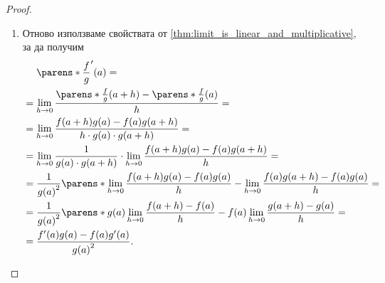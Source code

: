 \documentclass{../../common/topic}
\begin{document}
\begin{proof}
\begin{enumerate}
    \item Отново използваме свойствата от \cref{thm:limit_is_linear_and_multiplicative}, за да получим
    \begin{align*}
      &\phantom{{}={}} \parens*{ \frac f g }'(a)
      = \\ &=
      \lim_{h \to 0} \frac {\parens*{\frac f g }(a+h) - \parens*{\frac f g }(a)} h
      = \\ &=
      \lim_{h \to 0} \frac {f(a+h) g(a) - f(a) g(a+h)} {h \cdot g(a) \cdot g(a+h)}
      = \\ &=
      \lim_{h \to 0} \frac 1 {g(a) \cdot g(a+h)} \cdot \lim_{h \to 0} \frac {f(a+h) g(a) - f(a) g(a+h)} h
      = \\ &=
      \frac 1 {{g(a)}^2} \parens*{ \lim_{h \to 0} \frac {f(a+h) g(a) - f(a) g(a)} h - \lim_{h \to 0} \frac {f(a) g(a+h) - f(a) g(a)} h }
      = \\ &=
      \frac 1 {{g(a)}^2} \parens*{ g(a) \lim_{h \to 0} \frac {f(a+h) - f(a)} h - f(a) \lim_{h \to 0} \frac {g(a+h) - g(a)} h }
      = \\ &=
      \frac {f'(a) g(a) - f(a) g'(a)} {{g(a)}^2}.
    \end{align*}
  \end{enumerate}
\end{proof}
\end{document}
